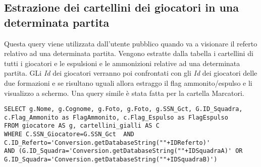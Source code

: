 \subsection*{Estrazione dei cartellini dei giocatori in una determinata partita}
Questa query viene utilizzata dall'utente pubblico quando va a visionare il referto relativo ad una determinata partita. Vengono estratte dalla tabella i cartellini di tutti i giocatori e le espulsioni e le ammonizioni relative ad una determinata partita. GLi \emph{Id} dei giocatori verranno poi confrontati con gli \emph{Id} dei giocatori delle due formazioni e se risultano uguali allora estraggo il flag ammonito/espulso e li visualizzo a schermo. Una query simile è stata fatta per la cartella Marcatori.

\begin{lstlisting}
SELECT g.Nome, g.Cognome, g.Foto, g.Foto, g.SSN_Gct, G.ID_Squadra, c.Flag_Ammonito as FlagAmmonito, c.Flag_Espulso as FlagEspulso
FROM giocatore AS g, cartellini_gialli AS C
WHERE C.SSN_Giocatore=G.SSN_Gct  AND C.ID_Referto='Conversion.getDatabaseString(""+IDReferto)'
AND (G.ID_Squadra='Conversion.getDatabaseString(""+IDSquadraA)' OR G.ID_Squadra='Conversion.getDatabaseString(""+IDSquadraB)')
\end{lstlisting}